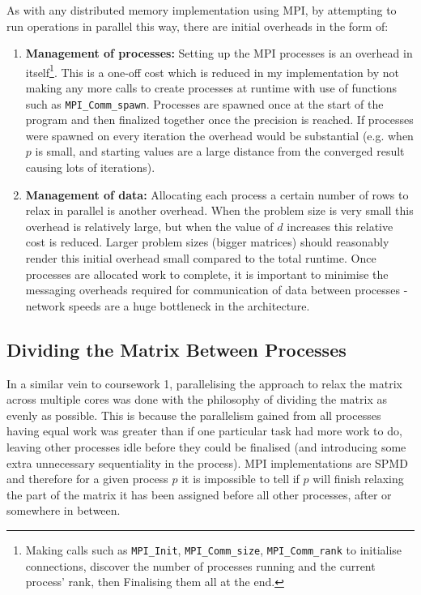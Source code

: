 \documentclass[11pt]{article}
\begin{document}
As with any distributed memory implementation using MPI, by attempting to run operations in parallel this way, there are initial overheads in the form of:
\begin{enumerate}
\item \textbf{Management of processes:} Setting up the MPI processes is an overhead in itself\footnote{Making calls such as \texttt{MPI\_Init}, \texttt{MPI\_Comm\_size}, \texttt{MPI\_Comm\_rank} to initialise connections, discover the number of processes running and the current process' rank, then Finalising them all at the end.}. This is a one-off cost which is reduced in my implementation by not making any more calls to create processes at runtime with use of functions such as \texttt{MPI\_Comm\_spawn}. Processes are spawned once at the start of the program and then finalized together once the precision is reached.  If processes were spawned on every iteration the overhead would be substantial (e.g. when $p$ is small, and starting values are a large distance from the converged result causing lots of iterations).
\item \textbf{Management of data:} Allocating each process a certain number of rows to relax in parallel is another overhead. When the problem size is very small this overhead is relatively large, but when the value of $d$ increases this relative cost is reduced. Larger problem sizes (bigger matrices) should reasonably render this initial overhead small compared to the total runtime. Once processes are allocated work to complete, it is important to minimise the messaging overheads required for communication of data between processes - network speeds are a huge bottleneck in the architecture.
\end{enumerate}

{\color{darkindigo}
\subsection*{Dividing the Matrix Between Processes}}
In a similar vein to coursework 1, parallelising the approach to relax the matrix across multiple cores was done with the philosophy of dividing the matrix as evenly as possible. This is because the parallelism gained from all processes having equal work was greater than if one particular task had more work to do, leaving other processes idle before they could be finalised (and introducing some extra unnecessary sequentiality in the process). MPI implementations are SPMD and therefore for a given process $p$ it is impossible to tell if $p$ will finish relaxing the part of the matrix it has been assigned before all other processes, after or somewhere in between.
\end{document}
